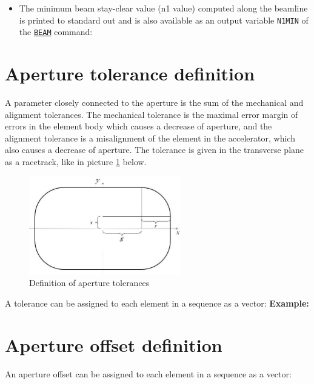 \begin{itemize}
   \item The minimum beam stay-clear value (n1 value) computed along the 
     beamline is printed to standard out and is also available as an output 
     variable {\tt N1MIN} of the \hyperref[sec:beam]{\tt BEAM} command: 

\end{itemize}

\section{Aperture tolerance definition}
\label{sec:apertol}
A parameter closely connected to the aperture is the sum of the
mechanical and alignment tolerances. The mechanical tolerance is 
the maximal error margin of errors in the element body which 
causes a decrease of aperture, and the alignment tolerance is a 
misalignment of the element in the accelerator, which also causes a 
decrease of aperture. The tolerance is given in the transverse plane 
as a racetrack, like in picture \ref{fig:aperture_tol} below. 

\begin{figure}[htb]
  \begin{center}
    \includegraphics[width=250px]{jpg/tolerance.jpg}
    \caption{Definition of aperture tolerances}
    \label{fig:aperture_tol}
  \end{center}
\end{figure}

A tolerance can be assigned to each element in a \madx sequence as a vector: 
{\bf Example:}

\section{Aperture offset definition}
\label{sec:aperoffset}

An aperture offset can be assigned to each element in a \madx sequence as a vector: 

